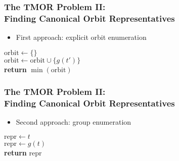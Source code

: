\documentclass{beamer}
\begin{document}
\begin{frame}
  \frametitle{The TMOR Problem II:\\Finding Canonical Orbit Representatives}

  \begin{itemize}
    \item First approach: explicit orbit enumeration
  \end{itemize}

  \vspace{.25cm}

  \begin{algorithmic}[1]
    \State $\mathrm{orbit} \gets \{\}$
    \\
        \State $\mathrm{orbit} \gets \mathrm{orbit} \cup \{g(t')\}$
      \EndFor
    \EndWhile
    \\
    \State \textbf{return} $\min(\mathrm{orbit})$
  \EndProcedure
  \end{algorithmic}
\end{frame}

\begin{frame}
  \frametitle{The TMOR Problem II:\\Finding Canonical Orbit Representatives}

  \begin{itemize}
    \item Second approach: group enumeration
  \end{itemize}

  \vspace{.25cm}

  \begin{algorithmic}[1]
    \State $\mathrm{repr} \gets t$
    \\
        \State $\mathrm{repr} \gets g(t)$
      \EndIf
    \EndFor
    \\
    \State \textbf{return} $\mathrm{repr}$
  \EndProcedure
  \end{algorithmic}
\end{frame}
\end{document}

